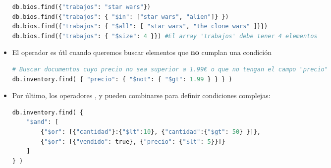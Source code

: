 \begin{itemize}
\begin{lstlisting}[language=python]
db.bios.find({"trabajos": "star wars"})
db.bios.find({"trabajos": { "$in": ["star wars", "alien"]} })
db.bios.find({"trabajos": { "$all": [ "star wars", "the clone wars" ]}})
db.bios.find({"trabajos": { "$size": 4 }}) #El array 'trabajos' debe tener 4 elementos
\end{lstlisting}
\item El operador  es útl cuando queremos buscar elementos que \textbf{no} cumplan una condición
\begin{lstlisting}[language=python]
# Buscar documentos cuyo precio no sea superior a 1.99€ o que no tengan el campo "precio"
db.inventory.find( { "precio": { "$not": { "$gt": 1.99 } } } )
\end{lstlisting}
\item Por último, los operadores ,  y  pueden combinarse para definir condiciones complejas:
\pagebreak
\begin{lstlisting}[language=python]
db.inventory.find( { 
	"$and": [
		{"$or": [{"cantidad"}:{"$lt":10}, {"cantidad":{"$gt": 50} }]},
		{"$or": [{"vendido": true}, {"precio": {"$lt": 5}}]}
	]
} )
\end{lstlisting}
\end{itemize}

